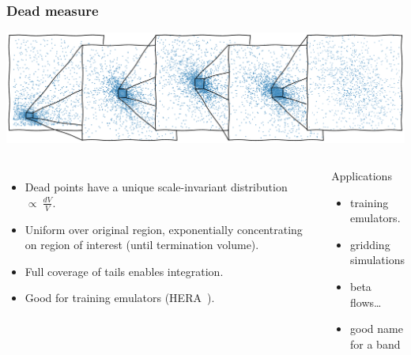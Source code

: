 \documentclass[aspectratio=169]{beamer}
\begin{document}
\begin{frame}
\begin{columns}
    \end{columns}
\end{frame}

\begin{frame}
    \frametitle{Dead measure}
    \includegraphics[width=\textwidth]{figures/dead_measure}
    \begin{columns}
        \begin{itemize}
            \item Dead points have a unique scale-invariant distribution $\propto\: \tfrac{dV}{V}$.
            \item Uniform over original region, exponentially concentrating on region of interest (until termination volume).
            \item Full coverage of tails enables integration.
            \item Good for training emulators (HERA~).
        \end{itemize}
        \begin{block}{Applications}
        \begin{itemize}
            \item training emulators.
            \item gridding simulations
            \item beta flows\ldots
            \item good name for a band
        \end{itemize}
        \end{block}
    \end{columns}
\end{frame}
\end{document}

